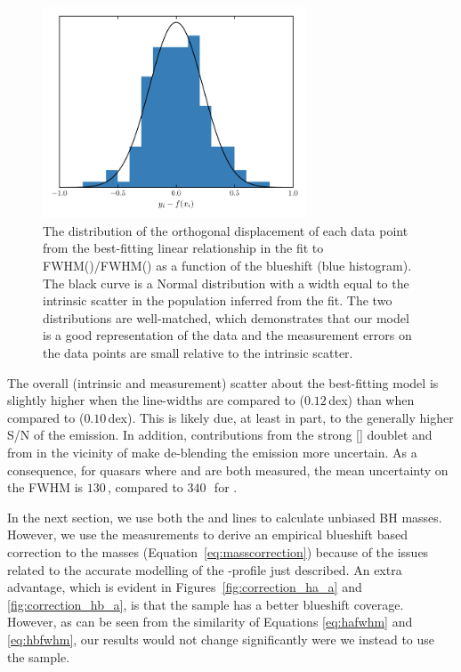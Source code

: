 \begin{figure}[t!]
    \centering 
    \includegraphics[width=0.7\textwidth]{figures/chapter03/intrinsic_scatter.pdf} 
    \caption[{The distribution of the orthogonal displacement of each data point from the best-fitting linear relationship in the fit to FWHM()/FWHM(\hans) as a function of the  blueshift.}]{The distribution of the orthogonal displacement of each data point from the best-fitting linear relationship in the fit to FWHM()/FWHM(\hans) as a function of the  blueshift (blue histogram). The black curve is a Normal distribution with a width equal to the intrinsic scatter in the population inferred from the fit. The two distributions are well-matched, which demonstrates that our model is a good representation of the data and the measurement errors on the data points are small relative to the intrinsic scatter.} 
    \label{fig:intrinsic_scatter}
\end{figure}

The overall (intrinsic and measurement) scatter about the best-fitting model is slightly higher when the  line-widths are compared to \hb ($0.12$\,dex) than when compared to \ha ($0.10$\,dex). 
This is likely due, at least in part, to the generally higher S/N of the \ha emission. 
In addition, contributions from the strong [] doublet and from  in the vicinity of \hb make de-blending the \hb emission more uncertain. 
As a consequence, for quasars where \ha and \hb are both measured, the mean uncertainty on the \ha FWHM is $130$\,\kms, compared to $340$\,\kms\, for \hbns. 

In the next section, we use both the \ha and \hb lines to calculate unbiased BH masses. 
However, we use the \ha measurements to derive an empirical  blueshift based correction to the  masses (Equation~\ref{eq:masscorrection}) because of the issues related to the accurate modelling of the \hbns-profile just described.  
An extra advantage, which is evident in Figures~\ref{fig:correction_ha_a} and \ref{fig:correction_hb_a}, is that the \ha sample has a better  blueshift coverage. 
However, as can be seen from the similarity of Equations \ref{eq:hafwhm} and \ref{eq:hbfwhm}, our results would not change significantly were we instead to use the \hb sample. 

